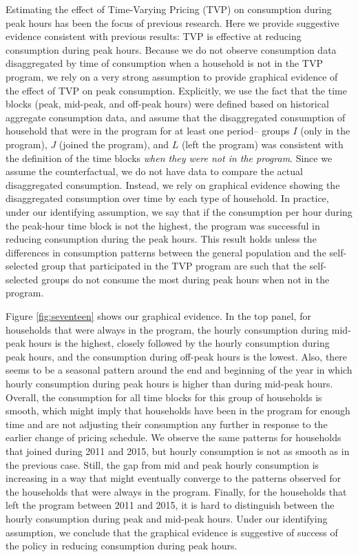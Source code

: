 Estimating the effect of Time-Varying Pricing (TVP) on consumption during peak hours has been the focus of previous research. Here we provide suggestive evidence consistent with previous results: TVP is effective at reducing consumption during peak hours. Because we do not observe consumption data disaggregated by time of consumption when a household is not in the TVP program, we rely on a very strong assumption to provide graphical evidence of the effect of TVP on peak consumption. Explicitly, we use the fact that the time blocks (peak, mid-peak, and off-peak hours) were defined based on historical aggregate consumption data, and assume that the disaggregated consumption of household that were in the program for at least one period– groups  $I$  (only in the program),  $J$  (joined the program), and  $L$  (left the program) was consistent with the definition of the time blocks \emph{when they were not in the program}. Since we assume the counterfactual, we do not have data to compare the actual disaggregated consumption. Instead, we rely on graphical evidence showing the disaggregated consumption over time by each type of household. In practice, under our identifying assumption, we say that if the consumption per hour during the peak-hour time block is not the highest, the program was successful in reducing consumption during the peak hours. This result holds unless the differences in consumption patterns between the general population and the self-selected group that participated in the TVP program are such that the self-selected groups do not consume the most during peak hours when not in the program.

Figure \ref{fig:seventeen} shows our graphical evidence. In the top panel, for households that were always in the program, the hourly consumption during mid-peak hours is the highest, closely followed by the hourly consumption during peak hours, and the consumption during off-peak hours is the lowest. Also, there seems to be a seasonal pattern around the end and beginning of the year in which hourly consumption during peak hours is higher than during mid-peak hours. Overall, the consumption for all time blocks for this group of households is smooth, which might imply that households have been in the program for enough time and are not adjusting their consumption any further in response to the earlier change of pricing schedule. We observe the same patterns for households that joined during 2011 and 2015, but hourly consumption is not as smooth as in the previous case. Still, the gap from mid and peak hourly consumption is increasing in a way that might eventually converge to the patterns observed for the households that were always in the program. Finally, for the households that left the program between 2011 and 2015, it is hard to distinguish between the hourly consumption during peak and mid-peak hours.  Under our identifying assumption, we conclude that the graphical evidence is suggestive of success of the policy in reducing consumption during peak hours.

